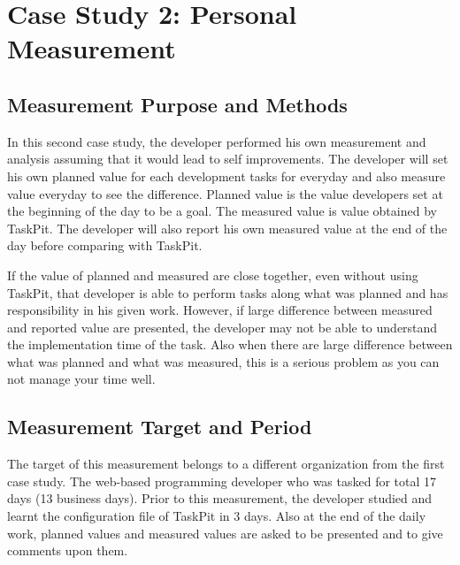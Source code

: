 \documentclass [paper]{ieice}
\begin{document}
\section{Case Study 2: Personal Measurement}

\subsection{Measurement Purpose and Methods}
	In this second case study, the developer performed his own measurement and analysis assuming that it would lead to self improvements. The developer will set his own planned value for each development tasks for everyday and also measure value everyday to see the difference. Planned value is the value developers set at the beginning of the day to be a goal. The measured value is value obtained by TaskPit. The developer will also report his own measured value at the end of the day before comparing with TaskPit.\par
	If the value of planned and measured are close together, even without using TaskPit, that developer is able to perform tasks along what was planned and has responsibility in his given work. However, if large difference between measured and reported value are presented, the developer may not be able to understand the implementation time of the task. Also when there are large difference between what was planned and what was measured, this is a serious problem as you can not manage your time well.

\subsection{Measurement Target and Period}
	The target of this measurement belongs to a different organization from the first case study. The web-based programming developer who was tasked for total 17 days (13 business days). Prior to this measurement, the developer studied and learnt the configuration file of TaskPit in 3 days. Also at the end of the daily work, planned values and measured values are asked to be presented and to give comments upon them.
\end{document}
